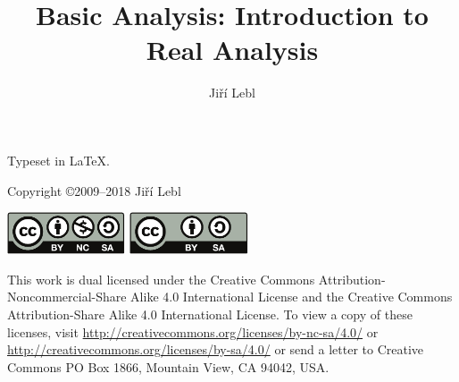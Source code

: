 \documentclass[12pt]{book}
\author{Ji\v{r}\'i Lebl}
\title{Basic Analysis: Introduction to Real Analysis}
\theoremstyle{plain}
\theoremstyle{remark}
\theoremstyle{definition}
\theoremstyle{exercise}
\theoremstyle{example}
\begin{document}
\ifpdf
\fi
\newlength{\centeroffset}
\setlength{\centeroffset}{-0.5\oddsidemargin}
\addtolength{\centeroffset}{0.5\evensidemargin}
\thispagestyle{empty}
\noindent\hspace*{\centeroffset}

\noindent\hspace*{\centeroffset}



\pagebreak

\vspace*{\fill}

\noindent
Typeset in \LaTeX.


\bigskip

\noindent
Copyright \copyright 2009--2018 Ji{\v r}\'i Lebl


\bigskip

\noindent
\includegraphics[width=1.38in]{figures/license}
\quad
\includegraphics[width=1.38in]{figures/license2}

\bigskip

\noindent
This work is dual licensed under
the Creative Commons
Attribution-Non\-commercial-Share Alike 4.0 International License and
the Creative Commons
Attribution-Share Alike 4.0 International License.
To view a
copy of these licenses, visit
\url{http://creativecommons.org/licenses/by-nc-sa/4.0/}
or
\url{http://creativecommons.org/licenses/by-sa/4.0/}
or send a letter to
Creative Commons
PO Box 1866, Mountain View, CA 94042, USA.
\end{document}
